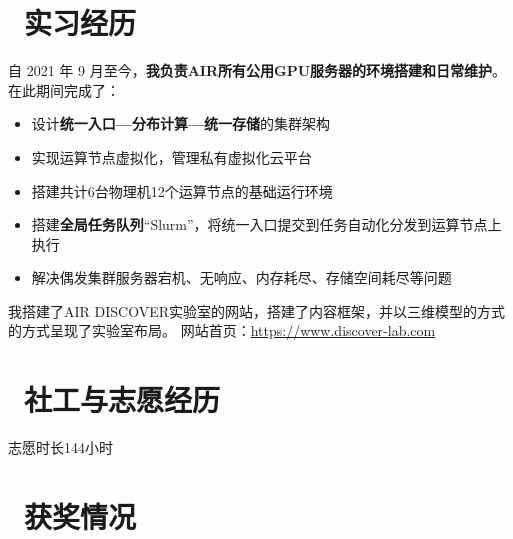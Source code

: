 \documentclass{resume}
\begin{document}
\section{\faCogs\ 实习经历}
自 2021 年 9 月至今，\textbf{我负责AIR所有公用GPU服务器的环境搭建和日常维护}。在此期间完成了：
\begin{itemize}[parsep=0.5ex]
  \item 设计\textbf{统一入口—分布计算—统一存储}的集群架构
  \item 实现运算节点虚拟化，管理私有虚拟化云平台
  \item 搭建共计6台物理机12个运算节点的基础运行环境
  \item 搭建\textbf{全局任务队列}“Slurm”，将统一入口提交到任务自动化分发到运算节点上执行
  \item 解决偶发集群服务器宕机、无响应、内存耗尽、存储空间耗尽等问题
\end{itemize}
\vspace{0.5em}
我搭建了AIR DISCOVER实验室的网站，搭建了内容框架，并以三维模型的方式的方式呈现了实验室布局。
网站首页：\href{https://www.discover-lab.com}{https://www.discover-lab.com}


\section{\faChild \ 社工与志愿经历}
\vspace{0.5em}
志愿时长144小时


\section{\faTrophy\ 获奖情况}
\vspace{0.5em}
\vspace{0.5em}
\vspace{0.5em}


%
%
\end{document}
